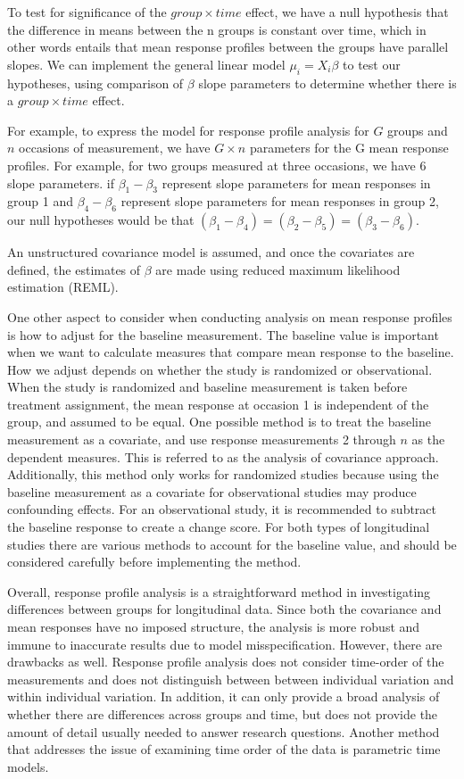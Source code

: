\documentclass[12pt, twoside]{amherstthesis}
\theoremstyle{definition}
\theoremstyle{definition}
\theoremstyle{definition}
\theoremstyle{remark}
\begin{document}
To test for significance of the \(group \times time\) effect, we have a null hypothesis that the difference in means between the n groups is constant over time, which in other words entails that mean response profiles between the groups have parallel slopes. We can implement the general linear model \(\mu_i = X_i\beta\) to test our hypotheses, using comparison of \(\beta\) slope parameters to determine whether there is a \(group \times time\) effect.

For example, to express the model for response profile analysis for \(G\) groups and \(n\) occasions of measurement, we have \(G \times n\) parameters for the G mean response profiles. For example, for two groups measured at three occasions, we have 6 slope parameters. if \(\beta_1 - \beta_3\) represent slope parameters for mean responses in group 1 and \(\beta_4 - \beta_6\) represent slope parameters for mean responses in group 2, our null hypotheses would be that \((\beta_1 - \beta_4) = (\beta_2-\beta_5) = (\beta_3-\beta_6)\).

An unstructured covariance model is assumed, and once the covariates are defined, the estimates of \(\beta\) are made using reduced maximum likelihood estimation (REML).

One other aspect to consider when conducting analysis on mean response profiles is how to adjust for the baseline measurement. The baseline value is important when we want to calculate measures that compare mean response to the baseline. How we adjust depends on whether the study is randomized or observational. When the study is randomized and baseline measurement is taken before treatment assignment, the mean response at occasion 1 is independent of the group, and assumed to be equal. One possible method is to treat the baseline measurement as a covariate, and use response measurements 2 through \(n\) as the dependent measures. This is referred to as the analysis of covariance approach. Additionally, this method only works for randomized studies because using the baseline measurement as a covariate for observational studies may produce confounding effects. For an observational study, it is recommended to subtract the baseline response to create a change score. For both types of longitudinal studies there are various methods to account for the baseline value, and should be considered carefully before implementing the method.

Overall, response profile analysis is a straightforward method in investigating differences between groups for longitudinal data. Since both the covariance and mean responses have no imposed structure, the analysis is more robust and immune to inaccurate results due to model misspecification. However, there are drawbacks as well. Response profile analysis does not consider time-order of the measurements and does not distinguish between between individual variation and within individual variation. In addition, it can only provide a broad analysis of whether there are differences across groups and time, but does not provide the amount of detail usually needed to answer research questions. Another method that addresses the issue of examining time order of the data is parametric time models.
\end{document}
